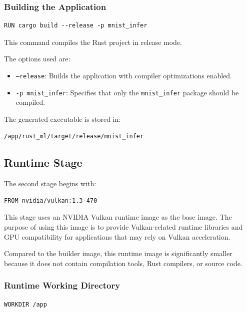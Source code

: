 \documentclass[11pt,a4paper]{article}
\begin{document}
\subsubsection{Building the Application}

\begin{verbatim}
RUN cargo build --release -p mnist_infer
\end{verbatim}

This command compiles the Rust project in release mode.

The options used are:

\begin{itemize}
    \item \texttt{--release}: Builds the application with compiler optimizations enabled.
    \item \texttt{-p mnist\_infer}: Specifies that only the \texttt{mnist\_infer} package should be compiled.
\end{itemize}

The generated executable is stored in:

\begin{verbatim}
/app/rust_ml/target/release/mnist_infer
\end{verbatim}

\subsection{Runtime Stage}

The second stage begins with:

\begin{verbatim}
FROM nvidia/vulkan:1.3-470
\end{verbatim}

This stage uses an NVIDIA Vulkan runtime image as the base image. The purpose of using this image is to provide Vulkan-related runtime libraries and GPU compatibility for applications that may rely on Vulkan acceleration.

Compared to the builder image, this runtime image is significantly smaller because it does not contain compilation tools, Rust compilers, or source code.


\subsubsection{Runtime Working Directory}

\begin{verbatim}
WORKDIR /app
\end{verbatim}
\end{document}
